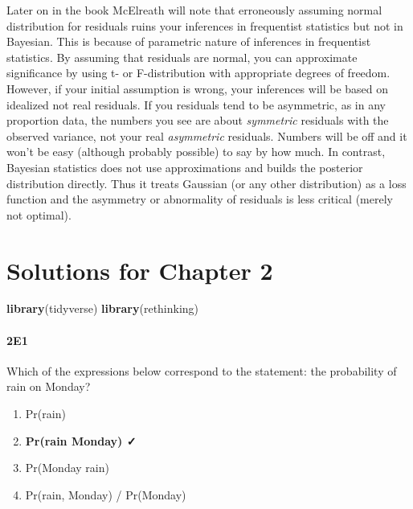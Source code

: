 \documentclass[
]{book}
\newenvironment{Shaded}{\begin{snugshade}}{\end{snugshade}}
\newcommand{\KeywordTok}[1]{\textcolor[rgb]{0.13,0.29,0.53}{\textbf{#1}}}
\newcommand{\NormalTok}[1]{#1}
\providecommand{\tightlist}{%
  \setlength{\itemsep}{0pt}\setlength{\parskip}{0pt}}
\begin{document}
Later on in the book McElreath will note that erroneously assuming normal distribution for residuals ruins your inferences in frequentist statistics but not in Bayesian. This is because of parametric nature of inferences in frequentist statistics. By assuming that residuals are normal, you can approximate significance by using t- or F-distribution with appropriate degrees of freedom. However, if your initial assumption is wrong, your inferences will be based on idealized not real residuals. If you residuals tend to be asymmetric, as in any proportion data, the numbers you see are about \emph{symmetric} residuals with the observed variance, not your real \emph{asymmetric} residuals. Numbers will be off and it won't be easy (although probably possible) to say by how much. In contrast, Bayesian statistics does not use approximations and builds the posterior distribution directly. Thus it treats Gaussian (or any other distribution) as a loss function and the asymmetry or abnormality of residuals is less critical (merely not optimal).

\hypertarget{solutions-for-chapter-2}{%
\chapter{Solutions for Chapter 2}\label{solutions-for-chapter-2}}

\begin{Shaded}
\begin{Highlighting}[]
\KeywordTok{library}\NormalTok{(tidyverse)}
\KeywordTok{library}\NormalTok{(rethinking)}
\end{Highlighting}
\end{Shaded}

\hypertarget{e1}{%
\subsubsection*{2E1}\label{e1}}

Which of the expressions below correspond to the statement: the probability of rain on Monday?

\begin{enumerate}
\def\labelenumi{\arabic{enumi}.}
\tightlist
\item
  Pr(rain)
\item
  \textbf{Pr(rain \textbar{} Monday) ✓}
\item
  Pr(Monday \textbar{} rain)
\item
  Pr(rain, Monday) / Pr(Monday)
\end{enumerate}
\end{document}
